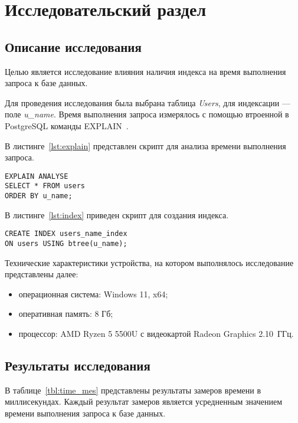 \chapter{Исследовательский раздел}

\section{Описание исследования}

Целью является исследование влияния наличия индекса на время выполнения запроса к базе данных.

Для проведения исследования была выбрана таблица \textit{Users}, для индексации --- поле \textit{u\_name}.
Время выполнения запроса измерялось с помощью втроенной в PostgreSQL команды EXPLAIN~\cite{explain}.

В листинге~\ref{lst:explain} представлен скрипт для анализа времени выполнения запроса.
\begin{lstlisting}[label={lst:explain}, caption={Скрипт для анализа времени выполнения запроса}]
EXPLAIN ANALYSE
SELECT * FROM users
ORDER BY u_name;
\end{lstlisting}

В листинге~\ref{lst:index} приведен скрипт для создания индекса.
\begin{lstlisting}[label={lst:index}, caption={Скрипт для создания индекса}]
CREATE INDEX users_name_index
ON users USING btree(u_name);
\end{lstlisting}

Технические характеристики устройства, на котором выполнялось исследование представлены далее:
\begin{itemize}[label={---}]
	\item операционная система: Windows 11, x64;
	\item оперативная память: 8 Гб;
	\item процессор: AMD Ryzen 5 5500U с видеокартой Radeon Graphics 2.10~ГГц.
\end{itemize}

\section{Результаты исследования}

В таблице~\ref{tbl:time_mes} представлены результаты замеров времени в миллисекундах.
Каждый результат замеров является усредненным значением времени выполнения запроса к базе данных.

